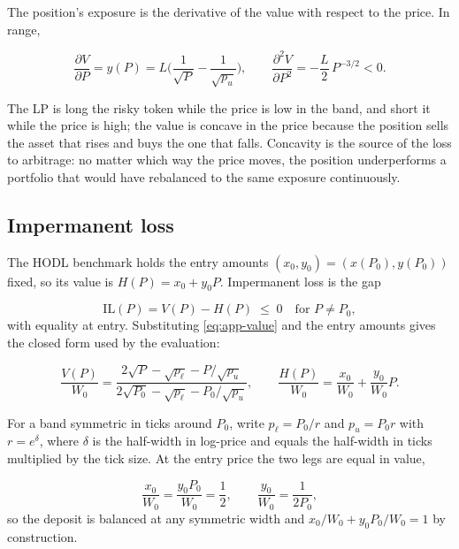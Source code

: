 The position's exposure is the derivative of the value with respect to the
price. In range,

\begin{equation}
\frac{\partial V}{\partial P} = y(P) = L\Big(\frac{1}{\sqrt{P}}-\frac{1}{\sqrt{p_u}}\Big),
\qquad
\frac{\partial^2 V}{\partial P^2} = -\frac{L}{2}\,P^{-3/2}<0.
\label{eq:app-greeks}
\end{equation}

The LP is long the risky token while the price is low in the band, and short
it while the price is high; the value is concave in the price because the
position sells the asset that rises and buys the one that falls. Concavity is
the source of the loss to arbitrage: no matter which way the price moves, the
position underperforms a portfolio that would have rebalanced to the same
exposure continuously.

\subsection{Impermanent loss}

The HODL benchmark holds the entry amounts $(x_0,y_0)=(x(P_0),y(P_0))$ fixed,
so its value is $H(P)=x_0+y_0P$. Impermanent loss is the gap

\begin{equation}
\mathrm{IL}(P) = V(P)-H(P)\;\le\;0\quad\text{for }P\ne P_0,
\label{eq:app-il}
\end{equation}
with equality at entry. Substituting \eqref{eq:app-value} and the entry
amounts gives the closed form used by the evaluation:

\begin{equation}
\frac{V(P)}{W_0} = \frac{2\sqrt{P}-\sqrt{p_\ell}-P/\sqrt{p_u}}
{2\sqrt{P_0}-\sqrt{p_\ell}-P_0/\sqrt{p_u}},
\qquad
\frac{H(P)}{W_0} = \frac{x_0}{W_0}+\frac{y_0}{W_0}P.
\label{eq:app-il-closed}
\end{equation}

For a band symmetric in ticks around $P_0$, write $p_\ell=P_0/r$ and
$p_u=P_0 r$ with $r=e^{\delta}$, where $\delta$ is the half-width in
log-price and equals the half-width in ticks multiplied by the tick size. At
the entry price the two legs are equal in value,

\begin{equation}
\frac{x_0}{W_0} = \frac{y_0P_0}{W_0} = \frac{1}{2},
\qquad
\frac{y_0}{W_0} = \frac{1}{2P_0},
\label{eq:app-amounts}
\end{equation}
so the deposit is balanced at any symmetric width and
$x_0/W_0+y_0P_0/W_0=1$ by construction.

